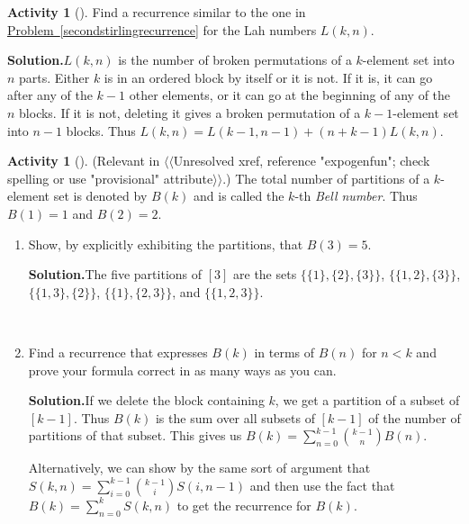 \documentclass[10pt,]{book}
\theoremstyle{plain}
\theoremstyle{definition}
\newtheorem{activity}[project]{Activity}
\numberwithin{equation}{chapter}
\newcommand{\lt}{<}
\begin{document}
\begin{activity}[]\label{activity-36}
Find a recurrence similar to the one in \hyperref[secondstirlingrecurrence]{Problem~\ref{secondstirlingrecurrence}} for the Lah numbers \(L(k,n)\).%
\par\medskip\noindent%
\textbf{Solution.}\quad \(L(k,n)\) is the number of broken permutations of a \(k\)-element set into \(n\) parts. Either \(k\) is in an ordered block by itself or it is not. If it is, it can go after any of the \(k-1\) other elements, or it can go at the beginning of any of the \(n\) blocks. If it is not, deleting it gives a broken permutation of a \(k-1\)-element set into \(n-1\) blocks. Thus \(L(k,n)=L(k-1,n-1) + (n+k-1)L(k,n)\).%
\end{activity}
\begin{activity}[]\label{BellNumberIntro}
(Relevant in {$\langle\langle$Unresolved xref, reference "expogenfun"; check spelling or use "provisional" attribute$\rangle\rangle$}.) The total number of partitions of a \(k\)-element set is denoted by \(B(k)\) and is called the \(k\)-th \emph{Bell number}. Thus \(B(1)=1\) and \(B(2) =2\).%
~\par
\begin{enumerate}[label=(\alph*)]
 \item Show, by explicitly exhibiting the partitions, that \(B(3)=5\).%
\par\medskip\noindent%
\textbf{Solution.}\quad The five partitions of \([3]\) are the sets \(\{\{1\},
\{2\},\{3\}\}\), \(\{\{1,2\},\{3\}\}\), \(\{\{1,3\},\{2\}\}\), \(\{\{1\},\{2,3\}\}\), and \(\{\{1,2,3\}\}\).%

~\par
\item Find a recurrence that expresses \(B(k)\) in terms of \(B(n)\) for \(n\lt  k\) and prove your formula correct in as many ways as you can.%
\par\medskip\noindent%
\textbf{Solution.}\quad If we delete the block containing \(k\), we get a partition of a subset of \([k-1]\). Thus \(B(k)\) is the sum over all subsets of \([k-1]\) of the number of partitions of that subset. This gives us \(B(k)= \sum_{n=0}^{k-1}{k-1\choose n}B(n)\).%
\par
Alternatively, we can show by the same sort of argument that \(S(k,n)=\sum_{i=0}^{k-1} {k-1\choose i}S(i,n-1)\) and then use the fact that \(B(k)=\sum_{n=0}^k S(k,n)\) to get the recurrence for \(B(k)\).%


\end{enumerate}
\end{activity}
\end{document}
